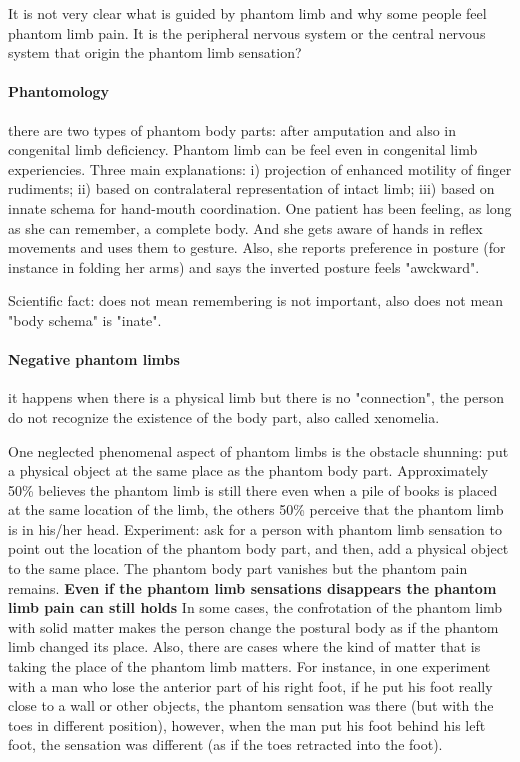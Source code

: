 \documentclass[12pt,article,oneside,a4paper]{memoir}
\begin{document}
It is not very clear what is guided by phantom limb and why some people feel phantom limb pain. It is the peripheral nervous system or the central nervous system that origin the phantom limb sensation?

\paragraph{Phantomology} there are two types of phantom body parts: after amputation and also in congenital limb deficiency.
Phantom limb can be feel even in congenital limb experiencies. Three main explanations: i) projection of enhanced motility of finger rudiments; ii) based on contralateral representation of intact limb; iii) based on innate schema for hand-mouth coordination. 
One patient has been feeling, as long as she can remember, a complete body. And she gets aware of hands in reflex movements and uses them to gesture. Also, she reports preference in posture (for instance in folding her arms) and says the inverted posture feels "awckward".
 
Scientific fact: does not mean remembering is not important, also does not mean "body schema" is "inate".

\paragraph{Negative phantom limbs} it happens when there is a physical limb but there is no "connection", the person do not recognize the existence of the body part, also called xenomelia.

One neglected phenomenal aspect of phantom limbs is the obstacle shunning: put a physical object at the same place as the phantom body part. Approximately 50\% believes the phantom limb is still there even when a pile of books is placed at the same location of the limb, the others 50\% perceive that the phantom limb is in his/her head. Experiment: ask for a person with phantom limb sensation to point out the location of the phantom body part, and then, add a physical object to the same place. The phantom body part vanishes but the phantom pain remains. \textbf{Even if the phantom limb sensations disappears the phantom limb pain can still holds} In some cases, the confrotation of the phantom limb with solid matter makes the person change the postural body as if the phantom limb changed its place. Also, there are cases where the kind of matter that is taking the place of the phantom limb matters. For instance, in one experiment with a man who lose the anterior part of his right foot, if he put his foot really close to a wall or other objects, the phantom sensation was there (but with the toes in different position), however, when the man put his foot behind his left foot, the sensation was different (as if the toes retracted into the foot).
\end{document}
